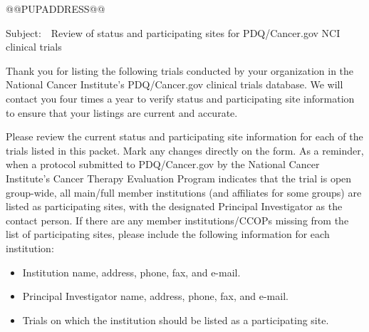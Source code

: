 \documentclass[letterpaper,12pt]{letter}
\begin{document}
\thispagestyle{empty}

\LetterheadWithLogo
  
\vspace{36pt}

@@PUPADDRESS@@

Subject:\ \ Review of status and participating sites for PDQ/Cancer.gov NCI
clinical trials

Thank you for listing the following trials conducted by your organization in
the National Cancer Institute's PDQ/Cancer.gov clinical trials database.  We
will contact you four times a year to verify status and participating site
information to ensure that your listings are current and accurate.

Please review the current status and participating site information for each
of the trials listed in this packet.  Mark any changes directly on the form.
As a reminder, when a protocol submitted to PDQ/Cancer.gov by the National
Cancer Institute's Cancer Therapy Evaluation Program indicates that the trial
is open group-wide, all main/full member institutions (and affiliates for some
groups) are listed as participating sites, with the designated
Principal Investigator as the contact person.  If there are any member
institutions/CCOPs missing from the list of participating sites, please
include the following information for each institution: 

\begin{itemize}
 \item Institution name, address, phone, fax, and e-mail.
 \item Principal Investigator name, address, phone, fax, and e-mail.
 \item Trials on which the institution should be listed as a participating
 site. 
\end{itemize}
\end{document}
